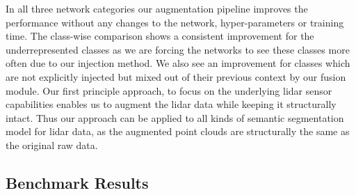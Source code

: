 \documentclass[letterpaper, 10 pt, conference]{ieeeconf}
\begin{document}
In all three network categories our augmentation pipeline improves the performance without any changes to the network, hyper-parameters or training time. The class-wise comparison shows a consistent improvement for the underrepresented classes as we are forcing the networks to see these classes more often due to our injection method. We also see an improvement for classes which are not explicitly injected but mixed out of their previous context by our fusion module. Our first principle approach, to focus on the underlying lidar sensor capabilities enables us to augment the lidar data while keeping it structurally intact. Thus our approach can be applied to all kinds of semantic segmentation model for lidar data, as the augmented point clouds are structurally the same as the original raw data. 

\subsection{Benchmark Results}
\begin{table*}[!htbp]
	\caption{\textbf{Results of Cylinder3D with and without our Augmentation Pipeline on the hidden SemanticKITTI Test Set}\\}
	\label{tab:results_test}
\end{table*}
\end{document}
